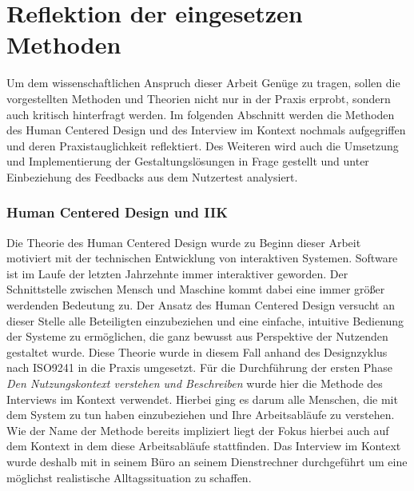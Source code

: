 \section{Reflektion der eingesetzen Methoden}
\label{subsection:reflection}

Um dem wissenschaftlichen Anspruch dieser Arbeit Genüge zu tragen, sollen die
vorgestellten Methoden und Theorien nicht nur in der Praxis erprobt, sondern
auch kritisch hinterfragt werden. Im folgenden Abschnitt werden die Methoden
des Human Centered Design und des Interview im Kontext nochmals aufgegriffen
und deren Praxistauglichkeit reflektiert. Des Weiteren wird auch die Umsetzung
und Implementierung der Gestaltungslösungen in Frage gestellt und unter
Einbeziehung des Feedbacks aus dem Nutzertest analysiert.

\subsubsection{Human Centered Design und IIK}
Die Theorie des Human Centered Design wurde zu Beginn dieser Arbeit motiviert
mit der technischen Entwicklung von interaktiven Systemen. Software ist im
Laufe der letzten Jahrzehnte immer interaktiver geworden. Der Schnittstelle
zwischen Mensch und Maschine kommt dabei eine immer größer werdenden Bedeutung
zu. Der Ansatz des Human Centered Design versucht an dieser Stelle alle
Beteiligten einzubeziehen und eine einfache, intuitive Bedienung der Systeme zu
ermöglichen, die ganz bewusst aus Perspektive der Nutzenden gestaltet wurde.
Diese Theorie wurde in diesem Fall anhand des Designzyklus nach ISO9241 in die
Praxis umgesetzt. Für die Durchführung der ersten Phase \textit{Den
    Nutzungskontext verstehen und Beschreiben} wurde hier die Methode des
Interviews im Kontext verwendet. Hierbei ging es darum alle Menschen, die mit
dem System zu tun haben einzubeziehen und Ihre Arbeitsabläufe zu verstehen. Wie
der Name der Methode bereits impliziert liegt der Fokus hierbei auch auf dem
Kontext in dem diese Arbeitsabläufe stattfinden. Das Interview im Kontext wurde
deshalb mit \ipName in seinem Büro an seinem Dienstrechner durchgeführt um eine
möglichst realistische Alltagssituation zu schaffen.

